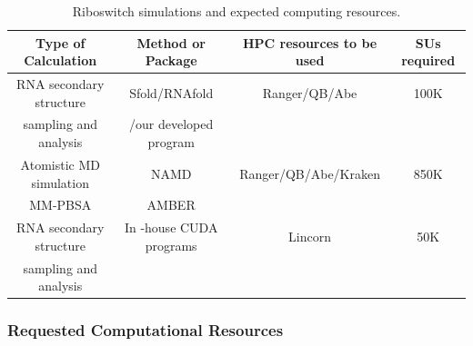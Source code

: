 \documentclass[a4paper,10pt]{article}
\begin{document}







\begin{table}[h]
\begin{center}
  \caption{Riboswitch simulations and expected computing resources.  }
\label{table:systems}
\begin{tabular}{| c | c | c | c |}
\hline
Type of Calculation &   Method or Package  &    HPC resources to be used & SUs required \\
\hline \hline
RNA secondary structure &
Sfold/RNAfold& Ranger/QB/Abe & 100K\\ 
sampling and analysis  & /our developed program  & & \\  \hline
Atomistic MD simulation & NAMD  & Ranger/QB/Abe/Kraken & 850K \\  
MM-PBSA        & AMBER    &  &  \\ \hline
RNA secondary structure & In -house CUDA programs & Lincorn & 50K \\
 sampling and analysis &   
&  &  \\
\hline
\end{tabular}
\end{center}
\end{table}

\subsubsection*{Requested Computational Resources}
\end{document}
